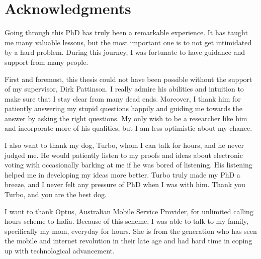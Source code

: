 \chapter*{Acknowledgments}
Going through this PhD has truly been a remarkable experience.  It has taught me many valuable lessons, 
but the most important one is to not get intimidated by a hard problem.  During this journey, I 
was fortunate to have guidance and support from many people. 	


First and foremost, this thesis could not have been possible without the support of my supervisor, Dirk Pattinson. I really 
admire his abilities and intuition to make sure that I stay clear from many dead ends. Moreover, 
I thank him for patiently answering my stupid questions happily and guiding me towards the
answer by asking the right questions. My only wish to be a researcher like 
him and incorporate more of his qualities, but I am less optimistic about my chance. 

I also want to thank my dog, Turbo, whom I can talk for hours, and he never judged me. He 
would patiently listen to my proofs
and ideas about electronic voting with occasionally barking at me if he was bored of listening. 
His listening helped me in developing my ideas more better. 
Turbo truly made my PhD a breeze, and I never felt any pressure of PhD when I was with him. Thank you
Turbo, and you are the best dog. 


I want to thank Optus, Australian Mobile Service Provider, for unlimited calling hours scheme to India. 
Because of this scheme, I was able to talk to my family, specifically my mom, everyday for hours. She is from the generation 
who has seen the mobile and internet revolution in their late age and had hard time in coping up with
technological advancement. 
 

